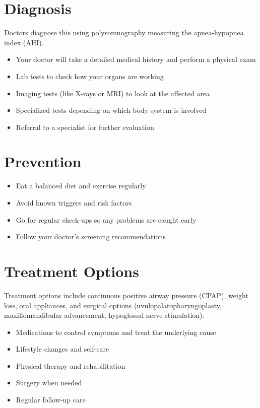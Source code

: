 \section{Diagnosis}
Doctors diagnose this using polysomnography measuring the apnea-hypopnea index (AHI).

\begin{itemize}[noitemsep]
  \item Your doctor will take a detailed medical history and perform a physical exam
  \item Lab tests to check how your organs are working
  \item Imaging tests (like X-rays or MRI) to look at the affected area
  \item Specialized tests depending on which body system is involved
  \item Referral to a specialist for further evaluation
\end{itemize}

\section{Prevention}

\begin{itemize}[noitemsep]
  \item Eat a balanced diet and exercise regularly
  \item Avoid known triggers and risk factors
  \item Go for regular check-ups so any problems are caught early
  \item Follow your doctor's screening recommendations
\end{itemize}

\section{Treatment Options}
Treatment options include continuous positive airway pressure (CPAP), weight loss, oral appliances, and surgical options (uvulopalatopharyngoplasty, maxillomandibular advancement, hypoglossal nerve stimulation).

\begin{itemize}[noitemsep]
  \item Medications to control symptoms and treat the underlying cause
  \item Lifestyle changes and self-care
  \item Physical therapy and rehabilitation
  \item Surgery when needed
  \item Regular follow-up care
\end{itemize}

